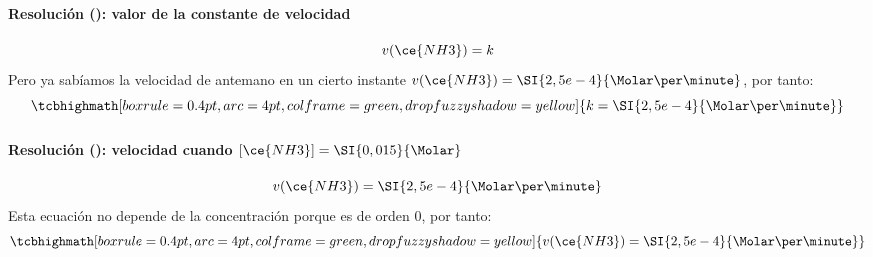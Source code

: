 \begin{frame}
    \frametitle{\ejerciciocmd}
    \framesubtitle{Resolución (): valor de la constante de velocidad}
    $$
        v(\ce{NH3}) = k
    $$
    Pero ya sabíamos la velocidad de antemano en un cierto instante $v(\ce{NH3}) = \SI{2,5e-4}{\Molar\per\minute}$, por tanto:
    $$
        \tcbhighmath[boxrule=0.4pt,arc=4pt,colframe=green,drop fuzzy shadow=yellow]{k = \SI{2,5e-4}{\Molar\per\minute}}
    $$
\end{frame}

\begin{frame}
    \frametitle{\ejerciciocmd}
    \framesubtitle{Resolución (): velocidad cuando $[\ce{NH3}]=\SI{0,015}{\Molar}$}
    $$
        v(\ce{NH3}) = \SI{2,5e-4}{\Molar\per\minute}
    $$
    Esta ecuación no depende de la concentración porque es de orden 0, por tanto:
    $$
        \tcbhighmath[boxrule=0.4pt,arc=4pt,colframe=green,drop fuzzy shadow=yellow]{v(\ce{NH3}) = \SI{2,5e-4}{\Molar\per\minute}}
    $$
\end{frame}
